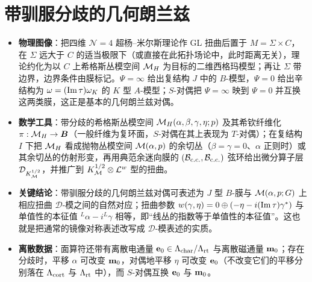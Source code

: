 

\section{带驯服分歧的几何朗兰兹}

\label{sec:4}

\begin{keytakeaways}
  \begin{itemize}[leftmargin=1.4em,itemsep=2pt,topsep=2pt]
    \item \textbf{物理图像}：把四维 ${\mathcal N}=4$ 超杨–米尔斯理论作 GL 扭曲后置于 $M=\Sigma\times C$，在 $\Sigma$ 远大于 $C$ 的适当极限下（或直接在此拓扑场论中，此时距离无关），理论约化为以 $C$ 上希格斯丛模空间 ${{\mathcal{M}}_H}$ 为目标的二维西格玛模型；再让 $\Sigma$ 带边界，边界条件由膜标记。$\Psi=\infty$ 给出复结构 $J$ 中的 $B$-模型，$\Psi=0$ 给出辛结构为 $\omega=({\rm Im}\,\tau)\omega_K$ 的 $K$ 型 $A$-模型；$S$-对偶把 $\Psi=\infty$ 映到 $\Psi=0$ 并互换这两类膜，这正是基本的几何朗兰兹对偶。
    \item \textbf{数学工具}：带分歧的希格斯丛模空间 ${{\mathcal{M}}_H}(\alpha,\beta,\gamma,\eta;p)$ 及其希钦纤维化 $\pi:{{\mathcal{M}}_H}\to\bm{B}$（一般纤维为复环面，$S$-对偶在其上表现为 $T$-对偶）；在复结构 $I$ 下把 ${{\mathcal{M}}_H}$ 看成抛物丛模空间 ${\mathcal{M}}(\alpha,p)$ 的余切丛（$\beta=\gamma=0$、$\alpha$ 正则时）或其余切丛的仿射形变，再用典范余迷向膜的 $({\mathcal B}_{\rm c.c.},{\mathcal B}_{\rm c.c.})$ 弦环给出微分算子层 ${\mathcal D}_{K_{\mathcal{M}}^{1/2}}$，并推广到 $K_{\mathcal{M}}^{1/2}\otimes{\mathcal L}^w$ 型的扭曲。
    \item \textbf{关键结论}：带驯服分歧的几何朗兰兹对偶可表述为 $J$ 型 $B$-膜与 ${\mathcal{M}}(\alpha,p;G)$ 上相应扭曲 ${\mathcal D}$-模之间的自然对应；扭曲参数 $w(\gamma,\eta)=0\oplus(-\eta-i({\rm Im}\,\tau)\gamma^*)$ 与单值性的本征值 ${}^L\alpha-i{}^L\gamma$ 相等，即“线丛的指数等于单值性的本征值”。这也就是把通常的镜像对称表述改写成 ${\mathcal D}$-模表述的实质。
    \item \textbf{离散数据}：面算符还带有离散电通量 ${\bf e}_0\in\Lambda_{\rm char}/\Lambda_{\rm rt}$ 与离散磁通量 ${\bf m}_0$；存在分歧时，平移 $\alpha$ 可改变 ${\bf m}_0$，对偶地平移 $\eta$ 可改变 ${\bf e}_0$（不改变它们的平移分别落在 $\Lambda_{\rm cort}$ 与 $\Lambda_{\rm rt}$ 中），而 $S$-对偶互换 ${\bf e}_0$ 与 ${\bf m}_0$。
  \end{itemize}
\end{keytakeaways}


